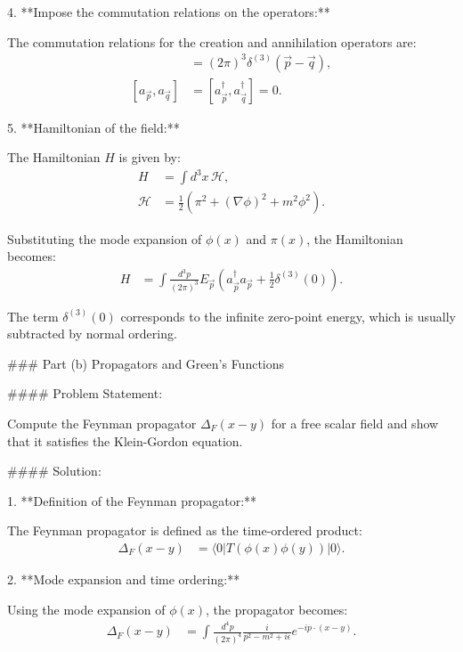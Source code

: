 4. **Impose the commutation relations on the operators:**

   The commutation relations for the creation and annihilation operators are:
   \begin{align}
       [a_{\vec{p}}, a_{\vec{q}}^\dagger] &= (2\pi)^3 \delta^{(3)}(\vec{p} - \vec{q}), \\
       [a_{\vec{p}}, a_{\vec{q}}] &= [a_{\vec{p}}^\dagger, a_{\vec{q}}^\dagger] = 0.
   \end{align}

5. **Hamiltonian of the field:**

   The Hamiltonian $H$ is given by:
   \begin{align}
       H &= \int d^3 x \, \mathcal{H}, \\
       \mathcal{H} &= \frac{1}{2} \left(\pi^2 + (\nabla \phi)^2 + m^2 \phi^2\right).
   \end{align}

   Substituting the mode expansion of $\phi(x)$ and $\pi(x)$, the Hamiltonian becomes:
   \begin{align}
       H &= \int \frac{d^3 p}{(2\pi)^3} E_{\vec{p}} \left(a_{\vec{p}}^\dagger a_{\vec{p}} + \frac{1}{2} \delta^{(3)}(0)\right).
   \end{align}

   The term $\delta^{(3)}(0)$ corresponds to the infinite zero-point energy, which is usually subtracted by normal ordering.

### Part (b) Propagators and Green's Functions

#### Problem Statement:

Compute the Feynman propagator $\Delta_F(x - y)$ for a free scalar field and show that it satisfies the Klein-Gordon equation.

#### Solution:

1. **Definition of the Feynman propagator:**

   The Feynman propagator is defined as the time-ordered product:
   \begin{align}
       \Delta_F(x - y) &= \langle 0 | T(\phi(x) \phi(y)) | 0 \rangle.
   \end{align}

2. **Mode expansion and time ordering:**

   Using the mode expansion of $\phi(x)$, the propagator becomes:
   \begin{align}
       \Delta_F(x - y) &= \int \frac{d^4 p}{(2\pi)^4} \frac{i}{p^2 - m^2 + i\epsilon} e^{-ip \cdot (x - y)}.
   \end{align}

